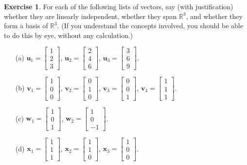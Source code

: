 \documentclass{amsart}
\newcommand{\R}         {{\mathbb{R}}}
\newcommand{\bsm}       {\left[\begin{smallmatrix}}
\newcommand{\esm}       {\end{smallmatrix}\right]}
\newcommand{\vu}        {\mathbf{u}}
\newcommand{\vv}        {\mathbf{v}}
\newcommand{\vw}        {\mathbf{w}}
\newcommand{\vx}        {\mathbf{x}}
\renewcommand{\:}{\colon}
\theoremstyle{definition}
\newtheorem{exercise}{Exercise}
\begin{document}
\begin{exercise}\label{ex-check-dependence}
 For each of the following lists of vectors, say (with justification) whether
 they are linearly independent, whether they span $\R^3$,
 and whether they form a basis of $\R^3$.  (If you
 understand the concepts involved, you should be able to do
 this by eye, without any calculation.)
 \begin{itemize}
  \item[(a)] $\vu_1=\bsm 1\\2\\3\esm$, 
             $\vu_2=\bsm 2\\4\\6\esm$,
             $\vu_3=\bsm 3\\6\\9\esm$.
  \item[(b)] $\vv_1=\bsm 1\\0\\0\esm$,
             $\vv_2=\bsm 0\\1\\0\esm$,
             $\vv_3=\bsm 0\\0\\1\esm$,
             $\vv_4=\bsm 1\\1\\1\esm$.
  \item[(c)] $\vw_1=\bsm 1\\0\\1\esm$,
             $\vw_2=\bsm 1\\0\\-1\esm$.
  \item[(d)] $\vx_1=\bsm 1\\1\\1\esm$,
             $\vx_2=\bsm 1\\1\\0\esm$,
             $\vx_3=\bsm 1\\0\\0\esm$.
 \end{itemize}
\end{exercise}
\end{document}
